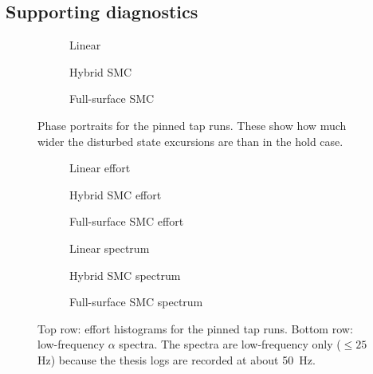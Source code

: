 \subsection*{Supporting diagnostics}

\begin{figure}[htbp]
  \centering
  \begin{subfigure}[t]{0.32\linewidth}
    \centering
    \caption{Linear}
  \end{subfigure}\hfill
  \begin{subfigure}[t]{0.32\linewidth}
    \centering
    \caption{Hybrid SMC}
  \end{subfigure}\hfill
  \begin{subfigure}[t]{0.32\linewidth}
    \centering
    \caption{Full-surface SMC}
  \end{subfigure}
  \caption{Phase portraits for the pinned tap runs. These show how much wider the disturbed state excursions are than in the hold case.}
  \label{fig:tap_phase_support}
\end{figure}

\begin{figure}[htbp]
  \centering
  \begin{subfigure}[t]{0.32\linewidth}
    \centering
    \caption{Linear effort}
  \end{subfigure}\hfill
  \begin{subfigure}[t]{0.32\linewidth}
    \centering
    \caption{Hybrid SMC effort}
  \end{subfigure}\hfill
  \begin{subfigure}[t]{0.32\linewidth}
    \centering
    \caption{Full-surface SMC effort}
  \end{subfigure}

  \medskip

  \begin{subfigure}[t]{0.32\linewidth}
    \centering
    \caption{Linear spectrum}
  \end{subfigure}\hfill
  \begin{subfigure}[t]{0.32\linewidth}
    \centering
    \caption{Hybrid SMC spectrum}
  \end{subfigure}\hfill
  \begin{subfigure}[t]{0.32\linewidth}
    \centering
    \caption{Full-surface SMC spectrum}
  \end{subfigure}
  \caption{Top row: effort histograms for the pinned tap runs. Bottom row: low-frequency $\alpha$ spectra. The spectra are low-frequency only ($\leq 25$ Hz) because the thesis logs are recorded at about \SI{50}{Hz}.}
  \label{fig:tap_effort_spectrum_support}
\end{figure}

